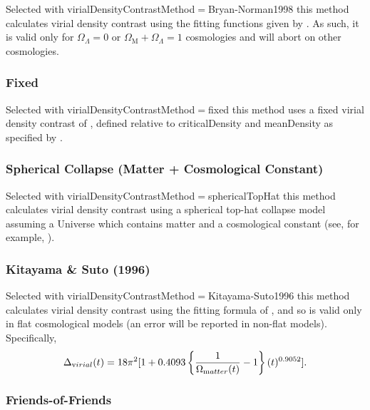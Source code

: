Selected with {\normalfont \ttfamily virialDensityContrastMethod}$=${\normalfont \ttfamily Bryan-Norman1998} this method calculates virial density contrast using the fitting functions given by \cite{bryan_statistical_1998}. As such, it is valid only for $\Omega_\Lambda=0$ or $\Omega_{\mathrm M}+\Omega_\Lambda=1$ cosmologies and will abort on other cosmologies.

\subsubsection{Fixed}

Selected with {\normalfont \ttfamily virialDensityContrastMethod}$=${\normalfont \ttfamily fixed} this method uses a fixed virial density contrast of {\normalfont \ttfamily [virialDensityConstrastFixed]}, defined relative to {\normalfont \ttfamily criticalDensity} and {\normalfont \ttfamily meanDensity} as specified by {\normalfont \ttfamily [virialDensityConstrastFixedType]}.

\subsubsection{Spherical Collapse (Matter + Cosmological Constant)}

Selected with {\normalfont \ttfamily virialDensityContrastMethod}$=${\normalfont \ttfamily sphericalTopHat} this method calculates virial density contrast using a spherical top-hat collapse model assuming a Universe which contains matter and a cosmological constant (see, for example, \citealt{percival_cosmological_2005}).

\subsubsection{Kitayama \& Suto (1996)}

Selected with {\normalfont \ttfamily virialDensityContrastMethod}$=${\normalfont \ttfamily Kitayama-Suto1996} this method calculates virial density contrast using the fitting formula of \cite{kitayama_semianalytic_1996}, and so is valid only in flat cosmological models (an error will be reported in non-flat models). Specifically,
\begin{equation}
 \Delta_{\mathrm virial}(t) = 18 \pi^2 [1+0.4093 \left\{{1\over \Omega_{\mathrm matter}(t)}-1\right\}(t)^{0.9052}].
\end{equation}

\subsubsection{Friends-of-Friends}

